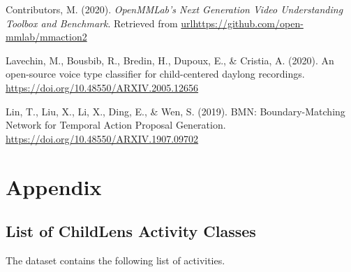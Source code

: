 \documentclass[
  man,floatsintext]{apa6}
\newlength{\cslhangindent}
\newenvironment{CSLReferences}[2] %
 {\begin{list}{}{%
  \setlength{\itemindent}{0pt}
  \setlength{\leftmargin}{0pt}
  \setlength{\parsep}{0pt}
  \ifodd #1
   \setlength{\leftmargin}{\cslhangindent}
   \setlength{\itemindent}{-1\cslhangindent}
  \fi
  \setlength{\itemsep}{#2\baselineskip}}}
 {\end{list}}
\begin{document}
\label{refs}
\begin{CSLReferences}{1}{0}
Contributors, M. (2020). \emph{{OpenMMLab}'s {Next Generation Video Understanding Toolbox} and {Benchmark}}. Retrieved from \url{urlhttps://github.com/open-mmlab/mmaction2}

Lavechin, M., Bousbib, R., Bredin, H., Dupoux, E., \& Cristia, A. (2020). An open-source voice type classifier for child-centered daylong recordings. \url{https://doi.org/10.48550/ARXIV.2005.12656}

Lin, T., Liu, X., Li, X., Ding, E., \& Wen, S. (2019). {BMN}: {Boundary-Matching Network} for {Temporal Action Proposal Generation}. \url{https://doi.org/10.48550/ARXIV.1907.09702}

\end{CSLReferences}

\endgroup

\newpage

\section{Appendix}\label{appendix}

\subsection{List of ChildLens Activity Classes}\label{list-of-childlens-activity-classes}

The dataset contains the following list of activities.
\end{document}
